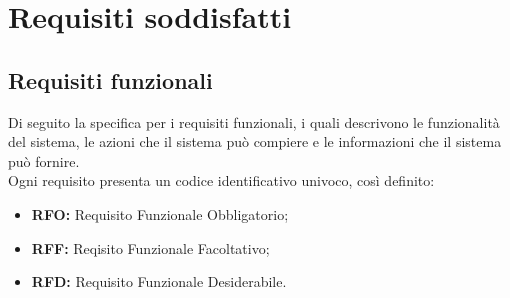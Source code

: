 \pagebreak
\section{Requisiti soddisfatti}
\subsection{Requisiti funzionali}

Di seguito la specifica per i requisiti funzionali, i quali descrivono le funzionalità del sistema, le azioni che il sistema può compiere e le informazioni che il sistema può fornire.\\
Ogni requisito presenta un codice identificativo univoco, così definito:
\begin{itemize}
    \item \textbf{RFO:} Requisito Funzionale Obbligatorio;
    \item \textbf{RFF:} Reqisito Funzionale Facoltativo;
    \item \textbf{RFD:} Requisito Funzionale Desiderabile.
\end{itemize}


